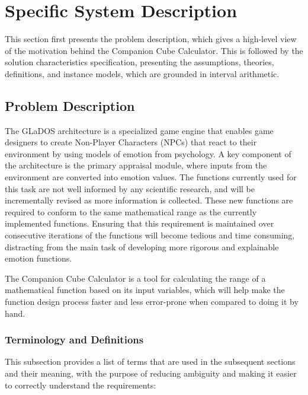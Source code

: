 \documentclass[12pt]{article}
\newcommand{\progname}{Companion Cube Calculator} %
\begin{document}
\section{Specific System Description}
\label{specific}
This section first presents the problem description, which gives a high-level
view of the motivation behind the \progname{}. This is followed by the solution 
characteristics specification, presenting the assumptions, theories, 
definitions, and instance models, which are grounded in interval arithmetic. 

\subsection{Problem Description} \label{Sec_pd}
The GLaDOS architecture is a specialized game engine that enables game 
designers to create Non-Player Characters (NPCs) that react to their 
environment by using models of emotion from psychology. A key component of the 
architecture is the primary appraisal module, where inputs from the environment 
are converted into emotion values. The functions currently used for this task 
are not well informed by any scientific research, and will be incrementally 
revised as more information is collected. These new functions are required to 
conform to the same mathematical range as the currently implemented functions. 
Ensuring that this requirement is maintained over consecutive iterations of the 
functions will become tedious and time consuming, distracting from the main 
task of developing more rigorous and explainable emotion functions.

The \progname{} is a tool for calculating the range of a mathematical function 
based on its input variables, which will help make the function design process 
faster and less error-prone when compared to doing it by hand.

\subsubsection{Terminology and  Definitions}

This subsection provides a list of terms that are used in the subsequent
sections and their meaning, with the purpose of reducing ambiguity and making it
easier to correctly understand the requirements:
\end{document}
